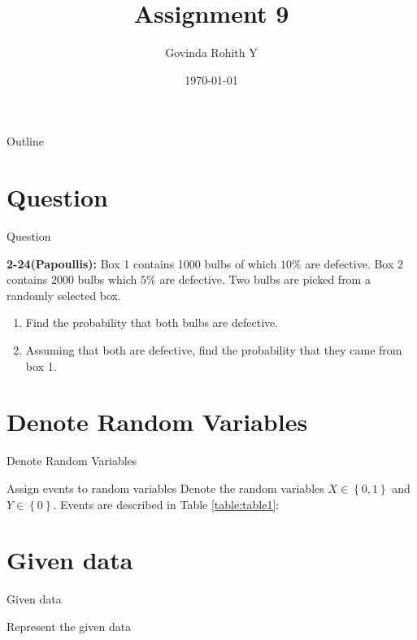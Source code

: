 \documentclass{beamer}
\title{Assignment 9}
\author{Govinda Rohith Y}
\date{\today}
\providecommand{\cbrak}[1]{\ensuremath{\left\{#1\right\}}}
\begin{document}
\begin{frame}
    \titlepage 
\end{frame}

\logo{}


\begin{frame}{Outline}
    \tableofcontents
\end{frame}


\section{Question}
\begin{frame}{Question}

\begin{block}{\textbf{2-24(Papoullis):}}
        Box 1 contains 1000 bulbs of which $10\%$ are defective. Box 2 contains 2000 bulbs which $5\%$ are defective. Two bulbs are picked from a randomly selected box.
\begin{enumerate}[label=(\alph*)]
    \item Find the probability that both bulbs are defective.
    \item Assuming that both are defective, find the probability that they came from box 1.
\end{enumerate}
    \end{block}

\end{frame}


\section{Denote Random Variables}
\begin{frame}{Denote Random Variables}
    \begin{block}{Assign events to random variables}
   Denote the random variables $X\in \cbrak{0,1}$ and $Y\in \cbrak{0}$. Events are described in Table \ref{table:table1}:
    \end{block}
    \begin{table}[h!]
	
	\caption{}
    \label{table:table1}
    \end{table}
     
     \end{frame} 
     \section{Given data}
     \begin{frame}{Given data}
\begin{block}{Represent the given data}

\end{block}
\begin{table}[h!]
	
	\caption{}
    \label{table:table2}
    \end{table}
\end{frame} 
\end{document}
